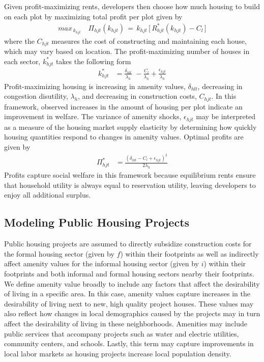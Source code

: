 \documentclass[12pt]{article}
\begin{document}
Given profit-maximizing rents, developers then choose how much housing to build on each plot by maximizing total profit per plot given by
\begin{align*}
max_{\,k_{hjt}} \,\,\,\,\,\, \Pi_{hjt}(k_{hjt}) \,=\, k_{hjt} \, \Big[ \, R_{hjt}^{*}(k_{hjt}) - C_{l} \, \Big ]
\end{align*}
\noindent where the $C_{hjt}$ measures the cost of constructing and maintaining each house, which may vary based on location.  The profit-maximizing number of houses in each sector, $k^{*}_{hjt}$ takes the following form
\begin{align*}
k_{hjt}^{*} &= \frac{\delta_{hlt}}{\lambda_h} \,\, - \frac{C_l}{\lambda_h} + \frac{\epsilon_{hjt}}{\lambda_h}
\end{align*}
Profit-maximizing housing is increasing in amenity values, $\delta_{hlt}$, decreasing in congestion disutility, $\lambda_{h}$, and decreasing in construction costs, $C_{hjt}$.  In this framework, observed increases in the amount of housing per plot indicate an improvement in welfare.  The variance of amenity shocks, $\epsilon_{hjt}$ may be interpreted as a measure of the housing market supply elasticity by determining how quickly housing quantities respond to changes in amenity values.  Optimal profits are given by
\begin{align*}
\Pi_{hjt}^{*}  &= \frac{(\delta_{hlt}-C_l + \epsilon_{hjt} )^2}{2\lambda_h}
\end{align*}
Profits capture social welfare in this framework because equilibrium rents ensure that household utility is always equal to reservation utility, leaving developers to enjoy all additional surplus. 

\subsection{Modeling Public Housing Projects}

Public housing projects are assumed to directly subsidize construction costs for the formal housing sector (given by $f$) within their footprints as well as indirectly affect amenity values for the informal housing sector (given by $i$) within their footprints and both informal and formal housing sectors nearby their footprints.  We define amenity value broadly to include any factors that affect the desirability of living in a  specific area.  In this case, amenity values capture increases in the desirability of living next to new, high quality project houses.  These values may also reflect how changes in local demographics caused by the projects may in turn affect the desirability of living in these neighborhoods.  Amenities may include public services that accompany projects such as water and electric utilities, community centers, and schools.  Lastly, this term may capture improvements in local labor markets as housing projects increase local population density.
\end{document}
